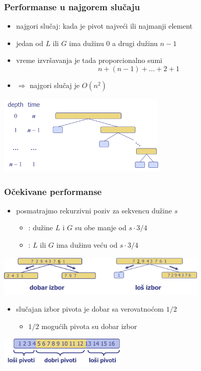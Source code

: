 \documentclass[compress]{beamer}
\begin{document}
\begin{frame}[fragile]
  \frametitle{Performanse u najgorem slučaju}
  \begin{itemize}
    \item najgori slučaj: kada je pivot najveći ili najmanji element
    \item jedan od $L$ ili $G$ ima dužinu 0 a drugi dužinu $n-1$
    \item vreme izvršavanja je tada proporcionalno sumi
    $$ n + (n-1) + \ldots + 2 + 1$$
    \item $\Rightarrow$ najgori slučaj je $O(n^2)$
  \end{itemize}
  \begin{center}
    \includegraphics[width=8cm]{asp-12-pic23.png}
  \end{center}
\end{frame}

\begin{frame}[fragile]
  \frametitle{Očekivane performanse}
  \begin{itemize}
    \item posmatrajmo rekurzivni poziv za sekvencu dužine $s$
    \begin{itemize}
      \item {}: dužine $L$ i $G$ su obe manje od $s\cdot 3/4$
      \item {}: $L$ ili $G$ ima dužinu veću od $s\cdot 3/4$
    \end{itemize}
  \end{itemize}
  \begin{center}
    \includegraphics[width=10cm]{asp-12-pic24.png}
  \end{center}
  \begin{itemize}
    \item slučajan izbor pivota je dobar sa verovatnoćom $1/2$
    \begin{itemize}
      \item $1/2$ mogućih pivota su dobar izbor
    \end{itemize}
  \end{itemize}
  \begin{center}
    \includegraphics[width=6cm]{asp-12-pic25.png}
  \end{center}
\end{frame}
\end{document}
